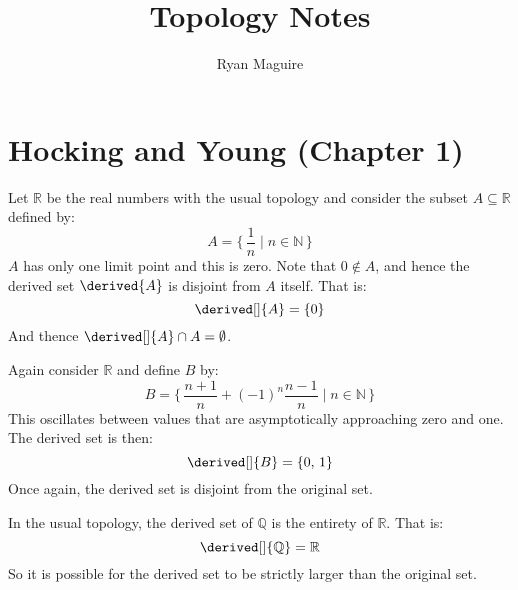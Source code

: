 \documentclass{article}                                                        %
\begin{document}
    \title{Topology Notes}
    \author{Ryan Maguire}
    \date{\vspace{-5ex}}
    \maketitle
    \section{Hocking and Young (Chapter 1)}
        \begin{example}
            Let $\mathbb{R}$ be the real numbers with the usual topology and
            consider the subset $A\subseteq\mathbb{R}$ defined by:
            \begin{equation}
                A=\Big\{\,\frac{1}{n}\;|\;n\in\mathbb{N}\,\Big\}
            \end{equation}
            $A$ has only one limit point and this is zero. Note that
            $0\notin{A}$, and hence the derived set $\derived{A}$ is disjoint
            from $A$ itself. That is:
            \begin{equation}
                \derived[]{A}=\{0\}
            \end{equation}
            And thence $\derived[]{A}\cap{A}=\emptyset$.
        \end{example}
        \begin{example}
            Again consider $\mathbb{R}$ and define $B$ by:
            \begin{equation}
                B=\Big\{\,\frac{n+1}{n}+(\minus{1})^{n}\frac{n-1}{n}\;|\;
                    n\in\mathbb{N}\,\Big\}
            \end{equation}
            This oscillates between values that are asymptotically approaching
            zero and one. The derived set is then:
            \begin{equation}
                \derived[]{B}=\{0,\,1\}
            \end{equation}
            Once again, the derived set is disjoint from the original set.
        \end{example}
        \begin{example}
            In the usual topology, the derived set of $\mathbb{Q}$ is the
            entirety of $\mathbb{R}$. That is:
            \begin{equation}
                \derived[]{\mathbb{Q}}=\mathbb{R}
            \end{equation}
            So it is possible for the derived set to be strictly larger than the
            original set.
        \end{example}
\end{document}
